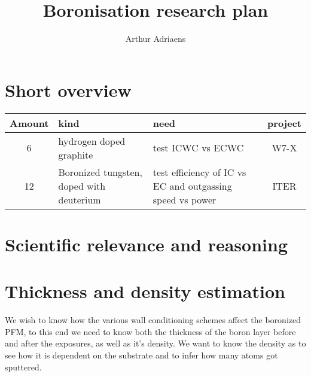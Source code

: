 \documentclass{article}
\title{Boronisation research plan}
\author{Arthur Adriaens}
\begin{document}
\maketitle

\section{Short overview}
\begin{center}
    \begin{tabular}{||c p{4cm} p{4cm} c||}
 \hline
 Amount & kind & need & project \\ [0.5ex]
 \hline\hline
 6 & hydrogen doped graphite & test ICWC vs ECWC & W7-X \\
 \hline
 12 & Boronized tungsten, doped with deuterium & test efficiency of IC vs EC and outgassing speed vs power & ITER \\
 \hline
\end{tabular}
\end{center}
\section{Scientific relevance and reasoning}
\section{Thickness and density estimation}
We wish to know how the various wall conditioning schemes affect the boronized PFM, to
this end we need to know both the thickness of the boron layer before and after the
exposures, as well as it's density.  We want to know the density as to see how
it is dependent on the substrate and to infer how many atoms got sputtered.
\end{document}
